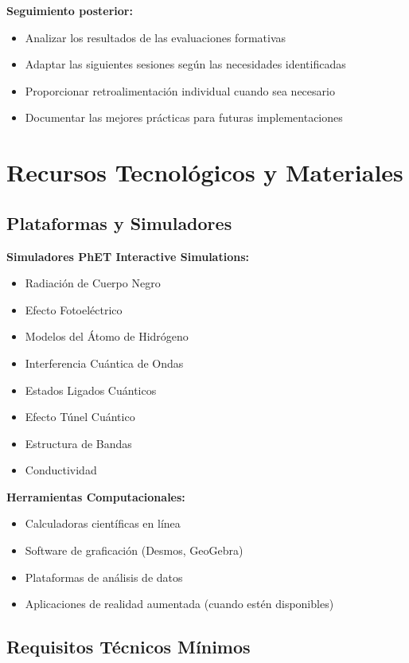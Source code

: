 \documentclass[12pt,a4paper]{book}
\begin{document}
	\textbf{Seguimiento posterior:}
	\begin{itemize}
		\item Analizar los resultados de las evaluaciones formativas
		\item Adaptar las siguientes sesiones según las necesidades identificadas
		\item Proporcionar retroalimentación individual cuando sea necesario
		\item Documentar las mejores prácticas para futuras implementaciones
	\end{itemize}
	
	\section{Recursos Tecnológicos y Materiales}
	
	\subsection{Plataformas y Simuladores}
	
	\textbf{Simuladores PhET Interactive Simulations:}
	\begin{itemize}
		\item Radiación de Cuerpo Negro
		\item Efecto Fotoeléctrico
		\item Modelos del Átomo de Hidrógeno
		\item Interferencia Cuántica de Ondas
		\item Estados Ligados Cuánticos
		\item Efecto Túnel Cuántico
		\item Estructura de Bandas
		\item Conductividad
	\end{itemize}
	
	\textbf{Herramientas Computacionales:}
	\begin{itemize}
		\item Calculadoras científicas en línea
		\item Software de graficación (Desmos, GeoGebra)
		\item Plataformas de análisis de datos
		\item Aplicaciones de realidad aumentada (cuando estén disponibles)
	\end{itemize}
	
	\subsection{Requisitos Técnicos Mínimos}
	
\end{document}
